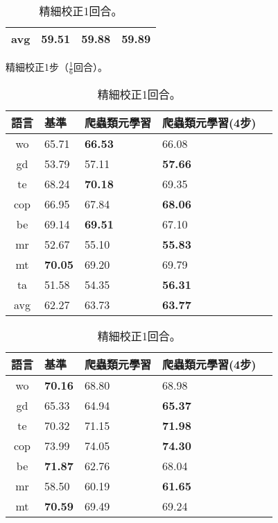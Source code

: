 \begin{table}[htbp]
\begin{subtable}[h]{0.8\textwidth}
\begin{tabular}[!ht]{c|lll}
                avg & 59.51 & 59.88 & \textbf{59.89} \\
                \hline
            \end{tabular}
        \caption{精細校正1步（$\frac{1}{6}$回合）。}
    \end{subtable}
    \vfill
    \begin{subtable}[h]{0.8\textwidth}
    \centering
        \begin{tabular}[!ht]{c|llll}
            \hline
            語言 & 基準 & 爬蟲類元學習 & 爬蟲類元學習(4步) \\
            \hline\hline
            wo & 65.71 & \textbf{66.53} & 66.08 \\
            gd & 53.79 & 57.11 & \textbf{57.66} \\
            te & 68.24 & \textbf{70.18} & 69.35 \\
            cop & 66.95 & 67.84 & \textbf{68.06} \\
            be & 69.14 & \textbf{69.51} & 67.10 \\
            mr & 52.67 & 55.10 & \textbf{55.83} \\
            mt & \textbf{70.05} & 69.20 & 69.79 \\
            ta & 51.58 & 54.35 & \textbf{56.31} \\
            \hline
            avg & 62.27 & 63.73 & \textbf{63.77} \\
            \hline
        \end{tabular}
        \caption{精細校正1回合。}
    \end{subtable}
    \vfill
    \begin{subtable}[h]{0.8\textwidth}
        \centering
            \begin{tabular}[!ht]{c|llll}
                \hline
                語言 & 基準 & 爬蟲類元學習 & 爬蟲類元學習(4步) \\
                \hline\hline
                wo & \textbf{70.16} & 68.80 & 68.98 \\
                gd & 65.33 & 64.94 & \textbf{65.37} \\
                te & 70.32 & 71.15 & \textbf{71.98} \\
                cop & 73.99 & 74.05 & \textbf{74.30} \\
                be & \textbf{71.87} & 62.76 & 68.04 \\
                mr & 58.50 & 60.19 & \textbf{61.65} \\
                mt & \textbf{70.59} & 69.49 & 69.24 \\

\end{tabular}
\end{subtable}
\end{table}
